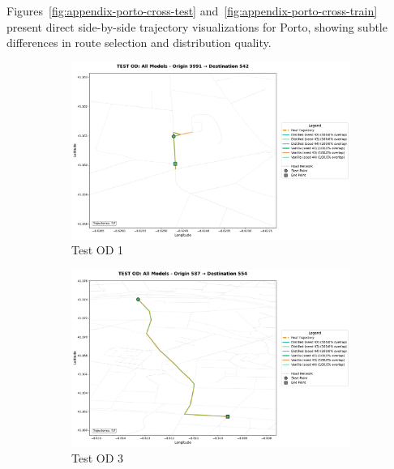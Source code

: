 Figures~\ref{fig:appendix-porto-cross-test} and~\ref{fig:appendix-porto-cross-train} present direct side-by-side trajectory visualizations for Porto, showing subtle differences in route selection and distribution quality.

\begin{figure}[H]
    \centering
    \begin{subfigure}{0.49\linewidth}
        \centering
        \includegraphics[width=\linewidth]{assets/plots/eval/porto/cross_model/test/test_od_comparison_1_origin9991_dest542.pdf}
        \caption{Test OD 1}
    \end{subfigure}
    \begin{subfigure}{0.49\linewidth}
        \centering
        \includegraphics[width=\linewidth]{assets/plots/eval/porto/cross_model/test/test_od_comparison_3_origin587_dest554.pdf}
        \caption{Test OD 3}
    \end{subfigure}
    \begin{subfigure}{0.49\linewidth}

\end{subfigure}
\end{figure}
